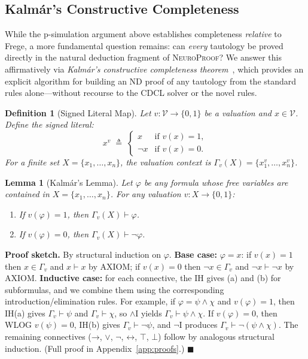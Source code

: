 \documentclass[conference]{IEEEtran}
\newtheorem{lemma}[theorem]{Lemma}
\newtheorem{definition}[theorem]{Definition}
\newenvironment{proof}[1][Proof]{\textbf{#1.} }{\hfill$\blacksquare$}
\newcommand{\proves}{\vdash}
\newcommand{\dland}{\mathbin{\wedge}}
\newcommand{\dlor}{\mathbin{\vee}}
\newcommand{\dlnot}{\neg}
\newcommand{\dlimp}{\mathbin{\to}}
\newcommand{\dliff}{\mathbin{\leftrightarrow}}
\newcommand{\dlbot}{\bot}
\newcommand{\dltop}{\top}
\newcommand{\NP}{\textsc{NeuroProof}}
\begin{document}
\subsection{Kalm\'{a}r's Constructive Completeness}

While the p-simulation argument above establishes completeness
\emph{relative} to Frege, a more fundamental question remains: can
\emph{every} tautology be proved directly in the natural deduction
fragment of \NP{}?  We answer this affirmatively via
\emph{Kalm\'{a}r's constructive completeness theorem}~\cite{Kalmar1935},
which provides an explicit algorithm for building an ND proof of
any tautology from the standard rules alone---without recourse to
the CDCL solver or the novel rules.

\begin{definition}[Signed Literal Map]
  Let $v : \mathcal{V} \to \{0,1\}$ be a valuation and
  $x \in \mathcal{V}$.  Define the \emph{signed literal}:
  \[
    x^{v} \;\triangleq\;
    \begin{cases}
      x       & \text{if } v(x) = 1, \\
      \neg x  & \text{if } v(x) = 0.
    \end{cases}
  \]
  For a finite set $X = \{x_1,\dots,x_n\}$, the valuation context
  is $\Gamma_v(X) = \{x_1^{v}, \dots, x_n^{v}\}$.
\end{definition}

\begin{lemma}[Kalm\'{a}r's Lemma]
  \label{lem:kalmar}
  Let $\varphi$ be any formula whose free variables are contained
  in $X = \{x_1, \dots, x_n\}$.  For any valuation
  $v : X \to \{0,1\}$:
  \begin{enumerate}
    \item[(a)] If $v(\varphi) = 1$, then
      $\Gamma_v(X) \proves \varphi$.
    \item[(b)] If $v(\varphi) = 0$, then
      $\Gamma_v(X) \proves \dlnot\varphi$.
  \end{enumerate}
\end{lemma}
\begin{proof}[Proof sketch]
  By structural induction on $\varphi$.  \textbf{Base case:}
  $\varphi = x$: if $v(x)=1$ then $x \in \Gamma_v$ and
  $x \proves x$ by \textsc{AXIOM}; if $v(x)=0$ then
  $\dlnot x \in \Gamma_v$ and $\dlnot x \proves \dlnot x$ by
  \textsc{AXIOM}.  \textbf{Inductive case:} for each connective,
  the IH gives (a) and (b) for subformulas, and we combine them using
  the corresponding introduction/elimination rules.  For example, if
  $\varphi = \psi \dland \chi$ and $v(\varphi)=1$, then IH(a) gives
  $\Gamma_v \proves \psi$ and $\Gamma_v \proves \chi$, so
  $\land$\textsc{I} yields $\Gamma_v \proves \psi \dland \chi$.  If
  $v(\varphi)=0$, then WLOG $v(\psi)=0$, IH(b) gives
  $\Gamma_v \proves \dlnot\psi$, and $\dlnot$\textsc{I} produces
  $\Gamma_v \proves \dlnot(\psi \dland \chi)$.  The remaining
  connectives ($\dlimp$, $\dlor$, $\dlnot$, $\dliff$, $\dltop$,
  $\dlbot$) follow by analogous structural induction.
  (Full proof in Appendix~\ref{app:proofs}.)
\end{proof}
\end{document}
